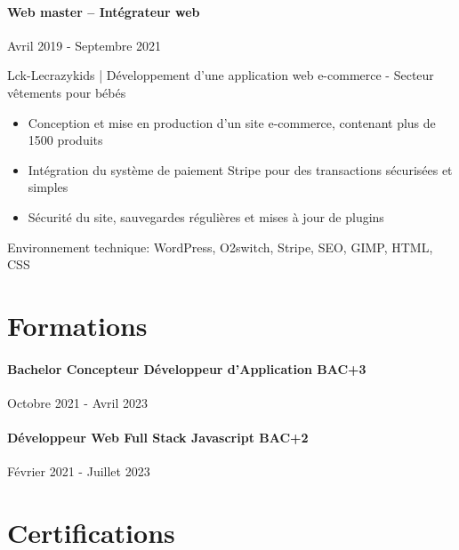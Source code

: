 \documentclass{article}
\begin{document}
\paragraph{Web master – Intégrateur web}\hspace*{\fill}Avril 2019 - Septembre 2021

\noindent
Lck-Lecrazykids | Développement d’une application web e-commerce - Secteur vêtements pour bébés

\raggedright  
\begin{itemize}
  \item{Conception et mise en production d'un site e-commerce, contenant plus de 1500 produits}
\item{Intégration du système de paiement Stripe pour des transactions sécurisées et simples}
\item{Sécurité du site, sauvegardes régulières et mises à jour de plugins}
\end{itemize}
\noindent
Environnement technique: WordPress, O2switch, Stripe, SEO, GIMP, HTML, CSS

\vspace{1ex}
\hrulefill
\section*{Formations}
\paragraph{Bachelor Concepteur Développeur d’Application BAC+3}\hspace*{\fill}Octobre 2021 - Avril 2023
\paragraph{Développeur Web Full Stack Javascript BAC+2}\hspace*{\fill}Février 2021 - Juillet 2023

\vspace{1ex}
\hrulefill
\section*{Certifications}
\end{document}
